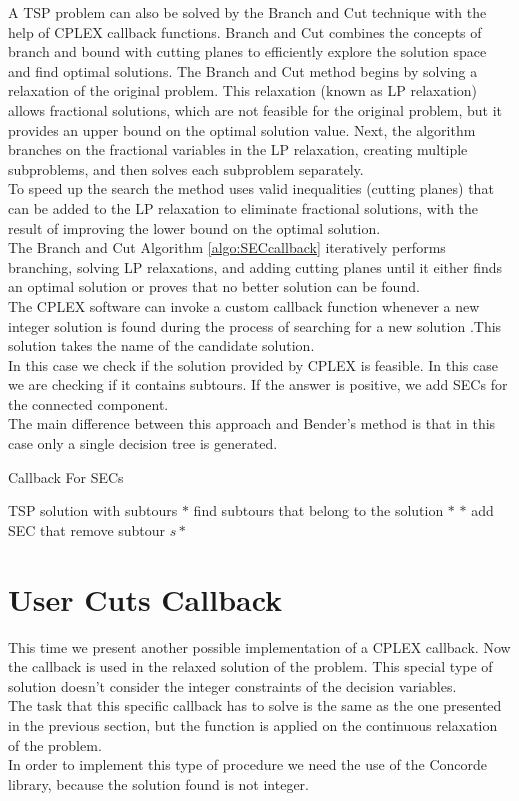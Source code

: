 A TSP problem can also be solved by the Branch and Cut technique with the help of CPLEX callback functions. Branch and Cut combines the concepts of branch and bound with cutting planes to efficiently explore the solution space and find optimal solutions. The Branch and Cut method begins by solving a relaxation of the original problem. This relaxation (known as LP relaxation) allows fractional solutions, which are not feasible for the original problem, but it provides an upper bound on the optimal solution value.
Next, the algorithm branches on the fractional variables in the LP relaxation, creating multiple subproblems, and then solves each subproblem separately.\\
To speed up the search the method uses valid inequalities (cutting planes) that can be added to the LP relaxation to eliminate fractional solutions, with the result of improving the lower bound on the optimal solution. \\
The Branch and Cut Algorithm \ref{algo:SECcallback} iteratively performs branching, solving LP relaxations, and adding cutting planes until it either finds an optimal solution or proves that no better solution can be found. \\
The CPLEX software can invoke a custom callback function whenever a new integer solution is found during the process of searching for a new solution .This solution takes the name of the candidate solution.\\
In this case we check if the solution provided by CPLEX is feasible. In this case we are checking if it contains subtours. If the answer is positive, we add SECs for the connected component. \\
The main difference between this approach and Bender’s method is that in this case only a single decision tree is generated.

\begin{algorithm}
    \caption{Callback For SECs}\label{algo:SECcallback}
    \begin{algorithmic}[1]
    \Require TSP solution with subtours
    \State $*$ find subtours that belong to the solution $*$
    \State $*$ add SEC that remove subtour $s *$
    \EndFor
    
    \end{algorithmic}
\end{algorithm}


\section{User Cuts Callback}
This time we present another possible implementation of a CPLEX callback. Now the callback is used in the relaxed solution of the problem. This special type of solution doesn’t consider the integer constraints of the decision variables. \\
The task that this specific callback has to solve is the same as the one presented in the previous section, but the function  is applied on the continuous relaxation of the problem.\\
In order to implement this type of procedure we need the use of the Concorde library, because the solution found is not integer.

